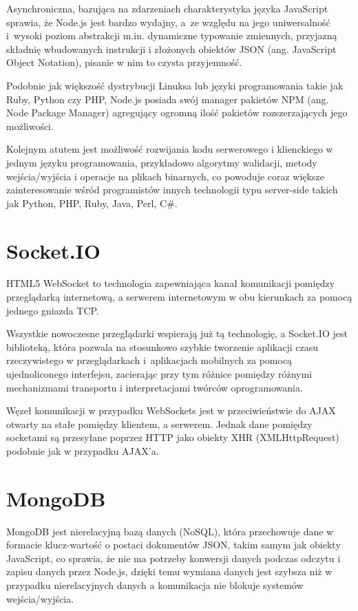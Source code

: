 \documentclass[twoside,a4paper,openright,12pt]{book}
\begin{document}
Asynchroniczna, bazująca na zdarzeniach charakterystyka języka JavaScript sprawia, że Node.js jest bardzo wydajny, a~ze względu na jego uniwersalność i~wysoki poziom abstrakcji m.in. dynamiczne typowanie zmiennych, przyjazną składnię wbudowanych instrukcji i złożonych obiektów JSON (ang. JavaScript Object Notation), pisanie w nim to czysta przyjemność.

Podobnie jak większość dystrybucji Linuksa lub języki programowania takie jak Ruby, Python czy PHP, Node.js posiada swój manager pakietów NPM (ang. Node Package Manager) agregujący ogromną ilość pakietów rozszerzających jego możliwości.

Kolejnym atutem jest możliwość rozwijania kodu serwerowego i klienckiego w jednym języku programowania, przykładowo algorytmy walidacji, metody wejścia/wyjścia i operacje na plikach binarnych, co powoduje coraz większe zainteresowanie wśród programistów innych technologii typu server-side takich jak Python, PHP, Ruby, Java, Perl, C\#.


\section{Socket.IO}

HTML5 WebSocket to technologia zapewniająca kanał komunikacji pomiędzy przeglądarką internetową, a serwerem internetowym w obu kierunkach za pomocą jednego gniazda TCP.

Wszystkie nowoczesne przeglądarki wspierają już tą technologię, a Socket.IO jest biblioteką, która pozwala na stosunkowo szybkie tworzenie aplikacji czasu rzeczywistego w przeglądarkach i~aplikacjach mobilnych za pomocą ujednoliconego interfejsu, zacierając przy tym różnice pomiędzy różnymi mechanizmami transportu i interpretacjami twórców oprogramowania.

Węzeł komunikacji w przypadku WebSockets jest w przeciwieństwie do AJAX otwarty na stałe pomiędzy klientem, a serwerem. Jednak dane pomiędzy socketami są przesyłane poprzez HTTP jako obiekty XHR (XMLHttpRequest) podobnie jak w przypadku AJAX'a.


\section{MongoDB}

MongoDB jest nierelacyjną bazą danych (NoSQL), która przechowuje dane w formacie klucz-wartość o postaci dokumentów JSON, takim samym jak obiekty JavaScript, co sprawia, że nie ma potrzeby konwersji danych podczas odczytu i zapisu danych przez Node.js, dzięki temu wymiana danych jest szybsza niż w przypadku nierelacyjnych danych a komunikacja nie blokuje systemów wejścia/wyjścia.
\end{document}
